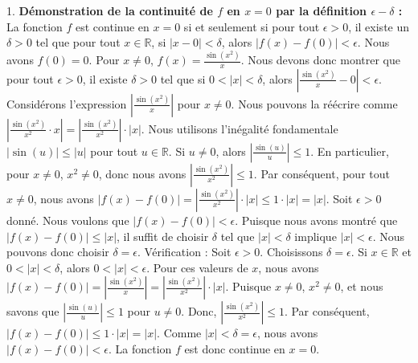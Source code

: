 \documentclass[12pt,a4paper]{report}
\begin{document}
1.  \textbf{Démonstration de la continuité de $f$ en $x=0$ par la définition $\epsilon-\delta$ :}
    La fonction $f$ est continue en $x=0$ si et seulement si pour tout $\epsilon > 0$, il existe un $\delta > 0$ tel que pour tout $x \in \mathbb{R}$, si $|x - 0| < \delta$, alors $|f(x) - f(0)| < \epsilon$.
    Nous avons $f(0) = 0$. Pour $x \neq 0$, $f(x) = \frac{\sin(x^2)}{x}$.
    Nous devons donc montrer que pour tout $\epsilon > 0$, il existe $\delta > 0$ tel que si $0 < |x| < \delta$, alors $\left| \frac{\sin(x^2)}{x} - 0 \right| < \epsilon$.
    Considérons l'expression $\left| \frac{\sin(x^2)}{x} \right|$ pour $x \neq 0$.
    Nous pouvons la réécrire comme $\left| \frac{\sin(x^2)}{x^2} \cdot x \right| = \left| \frac{\sin(x^2)}{x^2} \right| \cdot |x|$.
    Nous utilisons l'inégalité fondamentale $|\sin(u)| \le |u|$ pour tout $u \in \mathbb{R}$.
    Si $u \neq 0$, alors $\left| \frac{\sin(u)}{u} \right| \le 1$.
    En particulier, pour $x \neq 0$, $x^2 \neq 0$, donc nous avons $\left| \frac{\sin(x^2)}{x^2} \right| \le 1$.
    Par conséquent, pour tout $x \neq 0$, nous avons $|f(x) - f(0)| = \left| \frac{\sin(x^2)}{x^2} \right| \cdot |x| \le 1 \cdot |x| = |x|$.
    Soit $\epsilon > 0$ donné. Nous voulons que $|f(x) - f(0)| < \epsilon$.
    Puisque nous avons montré que $|f(x) - f(0)| \le |x|$, il suffit de choisir $\delta$ tel que $|x| < \delta$ implique $|x| < \epsilon$.
    Nous pouvons donc choisir $\delta = \epsilon$.
    Vérification : Soit $\epsilon > 0$. Choisissons $\delta = \epsilon$.
    Si $x \in \mathbb{R}$ et $0 < |x| < \delta$, alors $0 < |x| < \epsilon$.
    Pour ces valeurs de $x$, nous avons $|f(x) - f(0)| = \left| \frac{\sin(x^2)}{x} \right| = \left| \frac{\sin(x^2)}{x^2} \right| \cdot |x|$.
    Puisque $x \neq 0$, $x^2 \neq 0$, et nous savons que $\left| \frac{\sin(u)}{u} \right| \le 1$ pour $u \neq 0$.
    Donc, $\left| \frac{\sin(x^2)}{x^2} \right| \le 1$.
    Par conséquent, $|f(x) - f(0)| \le 1 \cdot |x| = |x|$.
    Comme $|x| < \delta = \epsilon$, nous avons $|f(x) - f(0)| < \epsilon$.
    La fonction $f$ est donc continue en $x=0$.
\end{document}
